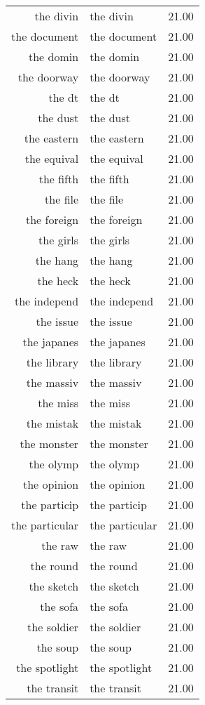 \begin{table}[ht]
\begin{tabular}{rlr}
  the divin & the divin & 21.00 \\ 
  the document & the document & 21.00 \\ 
  the domin & the domin & 21.00 \\ 
  the doorway & the doorway & 21.00 \\ 
  the dt & the dt & 21.00 \\ 
  the dust & the dust & 21.00 \\ 
  the eastern & the eastern & 21.00 \\ 
  the equival & the equival & 21.00 \\ 
  the fifth & the fifth & 21.00 \\ 
  the file & the file & 21.00 \\ 
  the foreign & the foreign & 21.00 \\ 
  the girls & the girls & 21.00 \\ 
  the hang & the hang & 21.00 \\ 
  the heck & the heck & 21.00 \\ 
  the independ & the independ & 21.00 \\ 
  the issue & the issue & 21.00 \\ 
  the japanes & the japanes & 21.00 \\ 
  the library & the library & 21.00 \\ 
  the massiv & the massiv & 21.00 \\ 
  the miss & the miss & 21.00 \\ 
  the mistak & the mistak & 21.00 \\ 
  the monster & the monster & 21.00 \\ 
  the olymp & the olymp & 21.00 \\ 
  the opinion & the opinion & 21.00 \\ 
  the particip & the particip & 21.00 \\ 
  the particular & the particular & 21.00 \\ 
  the raw & the raw & 21.00 \\ 
  the round & the round & 21.00 \\ 
  the sketch & the sketch & 21.00 \\ 
  the sofa & the sofa & 21.00 \\ 
  the soldier & the soldier & 21.00 \\ 
  the soup & the soup & 21.00 \\ 
  the spotlight & the spotlight & 21.00 \\ 
  the transit & the transit & 21.00 \\ 

\end{tabular}
\end{table}
